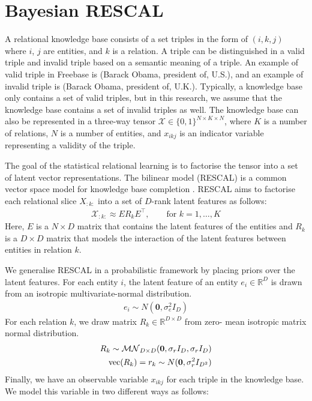 \section{Bayesian RESCAL}
A relational knowledge base consists of a set triples in the form of $(i, k, j)$ 
where $i$, $j$ are entities, and $k$ is a relation. A triple can be distinguished 
in a valid triple and invalid triple based on a semantic meaning of a triple. An 
example of valid triple in Freebase is (Barack Obama, president of, U.S.), and an 
example of invalid triple is (Barack Obama, president of, U.K.).
Typically, a knowledge base only contains a set of valid triples, but in this 
research, we assume that the knowledge base contains a set of invalid triples as 
well. The knowledge base can also be represented in a three-way tensor 
$\mathcal{X} \in \{0, 1\}^{N \times K \times N}$, where $K$ is a number of 
relations, $N$ is a number of entities, and $x_{ikj}$ is an indicator variable 
representing a validity of the triple. 

The goal of the statistical relational learning is to factorise the tensor into a 
set of latent vector representations. The bilinear model (RESCAL) is a common 
vector space model for knowledge base completion \cite{nickel2011three}. RESCAL 
aims to factorise each relational slice $X_{:k:}$ into a set of $D$-rank latent 
features as follows:
\begin{align}
\mathcal{X}_{:k:} \approx E R_k E^\top, \qquad \text{for } k = 1, \dots, K
\end{align}
Here, $E$ is a $N\times D$ matrix that contains the latent features of the 
entities and $R_k$ is a $D \times D$ matrix that models the interaction of the 
latent features between entities in relation $k$.

We generalise RESCAL in a probabilistic framework by placing priors over the 
latent features. For each entity $i$, the latent feature of an entity $e_i \in 
\mathbb{R}^{D}$ is drawn from an isotropic multivariate-normal distribution.
\begin{align}
\label{eqn:entity_gen}
e_i \sim {N}(\mathbf{0}, \sigma_e^2{I}_D)
\end{align}
For each relation $k$, we draw matrix $R_k \in \mathbb{R}^{D\times D}$ from zero-
mean isotropic matrix normal distribution.
\begin{align}
\label{eqn:relation_gen}
R_k \sim \mathcal{MN}_{D \times D}(\mathbf{0}, \sigma_r{I}_D, \sigma_r{I}_D) \\
\text{vec}(R_k) = r_k \sim N(\mathbf{0}, \sigma_r^2 I_{D^2}) \notag
\end{align}
Finally, we have an observable variable $x_{ikj}$ for each triple in the 
knowledge base. We model this variable in two different ways as follows:

